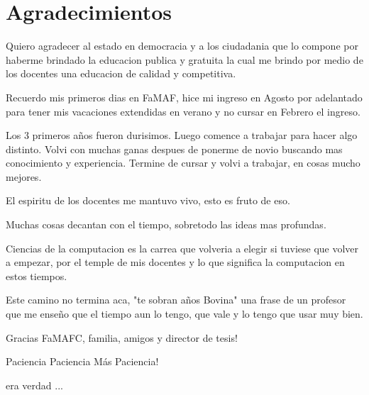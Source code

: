 \section{Agradecimientos}

Quiero agradecer al estado en democracia y a los ciudadania que lo compone por haberme
brindado la educacion publica y gratuita la cual me brindo por medio de los docentes 
una educacion de calidad y competitiva.

Recuerdo mis primeros dias en FaMAF, hice mi ingreso en Agosto por adelantado
para tener mis vacaciones extendidas en verano y no cursar en Febrero el ingreso.

Los 3 primeros años fueron durisimos. Luego comence a trabajar para hacer algo distinto.
Volvi con muchas ganas despues de ponerme de novio buscando mas conocimiento y experiencia.
Termine de cursar y volvi a trabajar, en cosas mucho mejores.

El espiritu de los docentes me mantuvo vivo, esto es fruto de eso.

Muchas cosas decantan con el tiempo, sobretodo las ideas mas profundas.

Ciencias de la computacion es la carrea que volveria a elegir si tuviese que volver 
a empezar, por el temple de mis docentes y lo que significa la computacion en estos tiempos.

Este camino no termina aca, "te sobran años Bovina" una frase de un profesor que me enseño
que el tiempo aun lo tengo, que vale y lo tengo que usar muy bien.

Gracias FaMAFC, familia, amigos y director de tesis!

Paciencia
Paciencia
Más Paciencia!

era verdad ...
\newpage